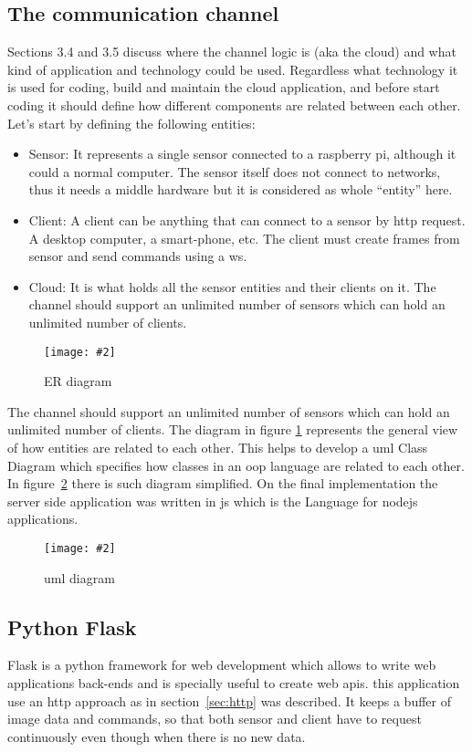\documentclass[hidelinks,11pt,a4paper,oneside,article]{memoir}
\newcommand{\putimage}[3][10] %
{
\begin{figure}[h]
	\centering
	\captionsetup{justification=centering}
	\texttt{[image: \#2]}
	\caption{#3}
	\label{fig:#2}
\end{figure}
}
\begin{document}
\subsection{The communication channel}\label{sec:the-communication-channel}
Sections 3.4 and 3.5 discuss where the channel logic is (aka the cloud) and what kind of application and technology could be used. Regardless what technology it is used for coding, build and maintain the cloud application, and before start coding it should define how different components are related between each other.
Let’s start by defining the following entities:
\begin{itemize}
    \item Sensor: It represents a single sensor connected to a raspberry pi, although it could a normal computer. The sensor itself does not connect to networks, thus it needs a middle hardware but it is considered as whole “entity” here.
    \item Client: A client can be anything that can connect to a sensor by \gls{http} request. A desktop computer, a smart-phone, etc. The client must create frames from sensor and send commands using a \gls{ws}.
    \item Cloud: It is what holds all the sensor entities and their clients on it.
    The channel should support an unlimited number of sensors which can hold an unlimited number of clients.
\end{itemize}
\putimage[15]{channel-er}{ER diagram}
The channel should support an unlimited number of sensors which can hold an unlimited number of clients.
The diagram in figure \ref{fig:channel-er} represents the general view of how entities are related to each other. This helps to develop a \gls{uml} Class Diagram which specifies how classes in an \gls{oop} language are related to each other. In figure~\ref{fig:channel-uml} there is such diagram simplified.
On the final implementation the server side application was written in \gls{js} which is the Language for \gls{nodejs} applications.
\putimage[15]{channel-uml}{\gls{uml} diagram}



\subsection{Python Flask}
Flask is a \gls{python} framework for web development which allows to write web applications back-ends and is specially useful to create web \gls{api}s. this application use an \gls{http} approach as in section~\ref{sec:http} was described. It keeps a buffer of image data and commands, so that both sensor and client have to request continuously even though when there is no new data. 
\end{document}
